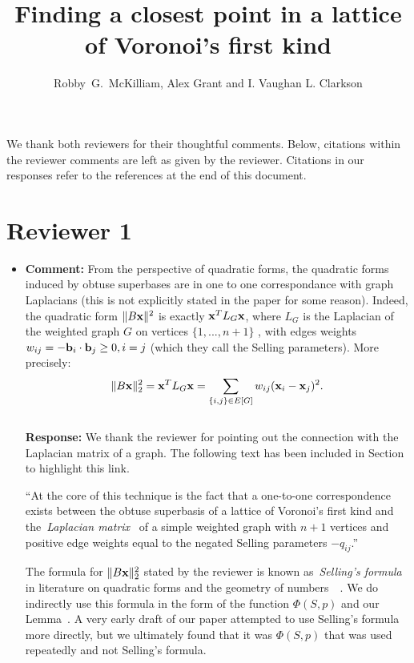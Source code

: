 \documentclass[a4paper,10pt]{article}
\title{Finding a closest point in a lattice of Voronoi's first kind}
\author{Robby~G.~McKilliam, Alex Grant and I. Vaughan L. Clarkson
}
\begin{document}
\maketitle

We thank both reviewers for their thoughtful comments.  Below, citations within the reviewer comments are left as given by the reviewer.  Citations in our responses refer to the references at the end of this document.


\section*{Reviewer 1}\label{sec:reviewer-1}

\begin{itemize}

\item\textbf{Comment:} 
From the perspective of quadratic forms, the quadratic forms induced by obtuse superbases are in one to one correspondance with graph Laplacians (this is not
explicitly stated in the paper for some reason). Indeed, the quadratic form $\|B\mathbf{x}\|^2$ is exactly $\mathbf{x}^T L_G \mathbf{x}$, where $L_G$ is the Laplacian of the weighted graph $G$ on vertices $\{ 1, . . . , n + 1 \}$ , with edges weights $w_{ij} = -\mathbf{b}_i \cdot \mathbf{b}_j \geq 0, i = j$ (which they call the Selling parameters). More precisely:
\[
\|B\mathbf{x}\|_2^2 = \mathbf{x}^T L_G \mathbf{x} = \sum_{ \{i,j\} \in E[G] } w_{ij} (\mathbf{x}_{i} - \mathbf{x}_{j} )^2.
\]
\\ \textbf{Response:} We thank the reviewer for pointing out the connection with the Laplacian matrix of a graph.  The following text has been included in Section~ to highlight this link.

``At the core of this technique is the fact that a one-to-one correspondence exists between the obtuse superbasis of a lattice of Voronoi's first kind and the~\emph{Laplacian matrix}~\cite{Chung_spectral_graph_theory_1997,Cvetković_spectra_graphs_1998} of a simple weighted graph with $n+1$ vertices and positive edge weights equal to the negated Selling parameters $-q_{ij}$.''

The formula for $\|B\mathbf{x}\|_2^2$ stated by the reviewer is known as~\emph{Selling's formula} in literature on quadratic forms and the geometry of numbers~\cite[Proposition 2.3.1]{Valentin2003_coverings_tilings_low_dimension}~\cite{Selling1874}.  We do indirectly use this formula in the form of the function $\Phi(S,p)$ and our Lemma~.  A very early draft of our paper attempted to use Selling's formula more directly, but we ultimately found that it was $\Phi(S,p)$ that was used repeatedly and not Selling's formula.


\end{itemize}
\end{document}
